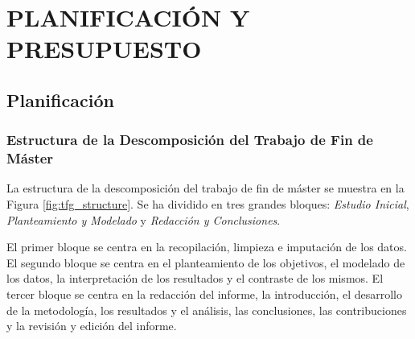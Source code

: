 \section{PLANIFICACIÓN Y PRESUPUESTO}\label{cap:results}

\subsection{Planificación}\label{sec:planificacion}

\subsubsection{Estructura de la Descomposición del Trabajo de Fin de Máster}\label{sec:edt}

La estructura de la descomposición del trabajo de fin de máster se muestra en la Figura \ref{fig:tfg_structure}. Se ha dividido en tres grandes bloques: \textit{Estudio Inicial}, \textit{Planteamiento y Modelado} y \textit{Redacción y Conclusiones}. 

El primer bloque se centra en la recopilación, limpieza e imputación de los datos. El segundo bloque se centra en el planteamiento de los objetivos, el modelado de los datos, la interpretación de los resultados y el contraste de los mismos. El tercer bloque se centra en la redacción del informe, la introducción, el desarrollo de la metodología, los resultados y el análisis, las conclusiones, las contribuciones y la revisión y edición del informe.


